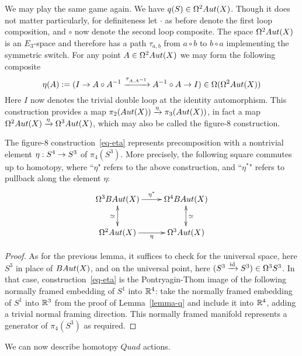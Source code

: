 \documentclass{amsart}
\begin{document}
We may play the same game again.  We have $q(S) \in \Omega^2 Aut(X)$.  Though it does not matter particularly, for definiteness let $\cdot$ as before denote the first loop composition, and $\circ$ now denote the second loop composite.  The space $\Omega^2 Aut(X)$ is an $E_3$-space and therefore has a path $\tau_{a,b}$ from $a \circ b$ to $b \circ a$ implementing the symmetric switch.  For any point $A \in \Omega^2 Aut(X)$ we may form the following composite
\begin{equation} \label{eq-eta}
\eta(A) := (I \rightarrow A \circ A^{-1} \xrightarrow{\tau_{A,A^{-1}}} A^{-1} \circ A \rightarrow I) \in \Omega(\Omega^2 Aut(X))
\end{equation}
Here $I$ now denotes the trivial double loop at the identity automorphism.  This construction provides a map $\pi_2(Aut(X)) \xrightarrow{\eta} \pi_3(Aut(X))$, in fact a map $\Omega^2 Aut(X) \xrightarrow{\eta} \Omega^3 Aut(X)$, which may also be called the figure-8 construction.

\begin{lemma} \label{lemma-eta}
The figure-8 construction~\eqref{eq-eta} represents precomposition with a nontrivial element $\eta: S^4 \rightarrow S^3$ of $\pi_4(S^3)$.  More precisely, the following square commutes up to homotopy, where ``$\eta$" refers to the above construction, and ``$\eta^\ast$" refers to pullback along the element $\eta$:
\begin{equation} \nn
\xymatrix{
\Omega^3 B\Aut(X) \ar[r]^{\eta^\ast} \ar@{<->}[d]_{\simeq} & \Omega^4 B\Aut(X)  \ar@{<->}[d]^{\simeq} \\
\Omega^2 \Aut(X) \ar[r]_{\eta} & \Omega^3 \Aut(X)
}
\end{equation}
\end{lemma}

\begin{proof}
As for the previous lemma, it suffices to check for the universal space, here $S^3$ in place of $BAut(X)$, and on the universal point, here $(S^3 \xrightarrow{\mathrm{id}} S^3) \in \Omega^3 S^3$.  In that case, construction~\eqref{eq-eta} is the Pontryagin-Thom image of the following normally framed embedding of $S^1$ into $\mathbb R^4$: take the normally framed embedding of $S^1$ into $\mathbb R^3$ from the proof of Lemma~\ref{lemma-q} and include it into $\mathbb R^4$, adding a trivial normal framing direction.  This normally framed manifold represents a generator of $\pi_4(S^3)$ as required.
\end{proof}

We can now describe homotopy $Quad$ actions.
\end{document}
